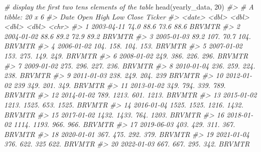 \documentclass[
]{article}
\newenvironment{Shaded}{\begin{snugshade}}{\end{snugshade}}
\newcommand{\CommentTok}[1]{\textcolor[rgb]{0.56,0.35,0.01}{\textit{#1}}}
\newcommand{\DecValTok}[1]{\textcolor[rgb]{0.00,0.00,0.81}{#1}}
\newcommand{\FunctionTok}[1]{\textcolor[rgb]{0.00,0.00,0.00}{#1}}
\newcommand{\NormalTok}[1]{#1}
\begin{document}
\begin{Shaded}
\begin{Highlighting}[]
\CommentTok{\# display the first two tens elements of the table}
\FunctionTok{head}\NormalTok{(yearly\_data, }\DecValTok{20}\NormalTok{) }
\CommentTok{\#\textgreater{} \# A tibble: 20 x 6}
\CommentTok{\#\textgreater{}    Date         Open   High    Low  Close Ticker}
\CommentTok{\#\textgreater{}    \textless{}date\textgreater{}      \textless{}dbl\textgreater{}  \textless{}dbl\textgreater{}  \textless{}dbl\textgreater{}  \textless{}dbl\textgreater{} \textless{}chr\textgreater{} }
\CommentTok{\#\textgreater{}  1 2003{-}04{-}11   74.0   88.6   73.6   88.6 BRVMTR}
\CommentTok{\#\textgreater{}  2 2004{-}01{-}02   88.6   89.2   72.9   89.2 BRVMTR}
\CommentTok{\#\textgreater{}  3 2005{-}01{-}03   89.2  107.    70.7  104.  BRVMTR}
\CommentTok{\#\textgreater{}  4 2006{-}01{-}02  104.   158.   104.   153.  BRVMTR}
\CommentTok{\#\textgreater{}  5 2007{-}01{-}02  153.   275.   149.   249.  BRVMTR}
\CommentTok{\#\textgreater{}  6 2008{-}01{-}02  249.   386.   226.   296.  BRVMTR}
\CommentTok{\#\textgreater{}  7 2009{-}01{-}02  275.   296.   227.   236.  BRVMTR}
\CommentTok{\#\textgreater{}  8 2010{-}01{-}04  236.   259.   224.   238.  BRVMTR}
\CommentTok{\#\textgreater{}  9 2011{-}01{-}03  238.   249.   204.   239   BRVMTR}
\CommentTok{\#\textgreater{} 10 2012{-}01{-}02  239    349.   201.   349.  BRVMTR}
\CommentTok{\#\textgreater{} 11 2013{-}01{-}02  349.   794.   339.   789.  BRVMTR}
\CommentTok{\#\textgreater{} 12 2014{-}01{-}02  789.  1213.   601.  1213.  BRVMTR}
\CommentTok{\#\textgreater{} 13 2015{-}01{-}02 1213.  1525.   653.  1525.  BRVMTR}
\CommentTok{\#\textgreater{} 14 2016{-}01{-}04 1525.  1525.  1216.  1432.  BRVMTR}
\CommentTok{\#\textgreater{} 15 2017{-}01{-}02 1432.  1433.   764.  1203.  BRVMTR}
\CommentTok{\#\textgreater{} 16 2018{-}01{-}02 1114.  1193.   966.   966.  BRVMTR}
\CommentTok{\#\textgreater{} 17 2019{-}06{-}03  403.   429.   311.   367.  BRVMTR}
\CommentTok{\#\textgreater{} 18 2020{-}01{-}01  367.   475.   292.   379.  BRVMTR}
\CommentTok{\#\textgreater{} 19 2021{-}01{-}04  376.   622.   325    622.  BRVMTR}
\CommentTok{\#\textgreater{} 20 2022{-}01{-}03  667.   667.   295.   342.  BRVMTR}


\end{Highlighting}
\end{Shaded}
\end{document}
